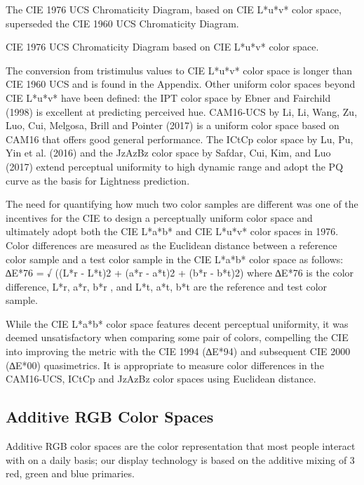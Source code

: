 The CIE 1976 UCS Chromaticity Diagram, based on CIE L*u*v* color space, superseded the CIE 1960 UCS Chromaticity Diagram.

CIE 1976 UCS Chromaticity Diagram based on CIE L*u*v* color space.

The conversion from tristimulus values to CIE L*u*v* color space is longer than CIE 1960 UCS and is found in the Appendix.
Other uniform color spaces beyond CIE L*u*v* have been defined: the IPT color space by Ebner and Fairchild (1998) is excellent at predicting perceived hue. CAM16-UCS by Li, Li, Wang, Zu, Luo, Cui, Melgosa, Brill and Pointer (2017) is a uniform color space based on CAM16 that offers good general performance. The ICtCp color space by Lu, Pu, Yin et al. (2016) and the JzAzBz color space by Safdar, Cui, Kim, and Luo (2017) extend perceptual uniformity to high dynamic range and adopt the PQ curve as the basis for Lightness prediction.

The need for quantifying how much two color samples are different was one of the incentives for the CIE to design a perceptually uniform color space and ultimately adopt both the CIE L*a*b* and CIE L*u*v* color spaces in 1976. Color differences are measured as the Euclidean distance between a reference color sample and a test color sample in the CIE L*a*b* color space as follows:
∆E*76 = √ ((L*r - L*t)2 + (a*r - a*t)2  + (b*r - b*t)2)
where ∆E*76 is the color difference, L*r, a*r, b*r , and L*t, a*t, b*t are the reference and test color sample.

While the CIE L*a*b* color space features decent perceptual uniformity, it was deemed unsatisfactory when comparing some pair of colors, compelling the CIE into improving the metric with the CIE 1994 (∆E*94) and subsequent CIE 2000  (∆E*00)  quasimetrics. It is appropriate to measure color differences in the CAM16-UCS, ICtCp and JzAzBz color spaces using Euclidean distance.

\subsection{Additive RGB Color Spaces}%
\label{subsec:additive-rgb-color-spaces}

Additive RGB color spaces are the color representation that most people interact with on a daily basis; our display technology is based on the additive mixing of 3 red, green and blue primaries.


